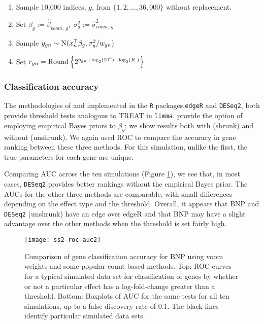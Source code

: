 \begin{enumerate}
\item Sample 10,000 indices, $g$, from $\{1,2,\ldots,36,000\}$ without replacement.
\item Set $\beta_g:= \hat{\beta}_{voom,~g},\; \sigma^2_g:= \hat{\sigma}^2_{voom,~g}$
\item Sample $y_{gn} \sim \operatorname{N}(x_{n}^\top\beta_g, \sigma^2_g/w_{gn})$
\item Set $r_{gn} = \operatorname{Round} \left\{ 2^{y_{gn} + \log_2(10^6) - \log_2(\bar{R}_{\cdot})} \right\}$
\end{enumerate}


\subsubsection{Classification accuracy}
The methodologies of \citet{edger2010} and \citet{deseq2014} implemented in the \texttt{R} packages,\texttt{edgeR} and \texttt{DESeq2}, both provide threshold tests analogous to TREAT in \texttt{limma}. \citet{deseq2014} provide the option of employing empirical Bayes priors to $\beta_g$; we show results both with (shrunk) and without (unshrunk). We again used ROC to compare the accuracy in gene ranking between these three methods. For this simulation, unlike the first, the true parameters for each gene are unique. 

Comparing AUC across the ten simulations (Figure \ref{ss2-roc}), we see that, in most cases, \texttt{DESeq2} provides better rankings without the empirical Bayes prior. The AUCs for the other three methods are comparable, with small differences depending on the effect type and the threshold. Overall, it appears that BNP and \texttt{DESeq2} (unshrunk) have an edge over edgeR and that BNP may have a slight advantage over the other methods when the threshold is set fairly high.

\begin{figure}[ht!]
\centering
\texttt{[image: ss2-roc-auc2]}
\begin{minipage}{.8\textwidth}
\caption{\small Comparison of gene classification accuracy for BNP using voom weights and some popular count-based methods. \small Top: ROC curves for a typical simulated data set for classification of genes by whether or not a particular effect has a log-fold-change greater than a threshold. Bottom: Boxplots of AUC for the same tests for all ten simulations, up to a false discovery rate of 0.1. The black lines identify particular simulated data sets.}
\label{ss2-roc}
\end{minipage}
\end{figure}

